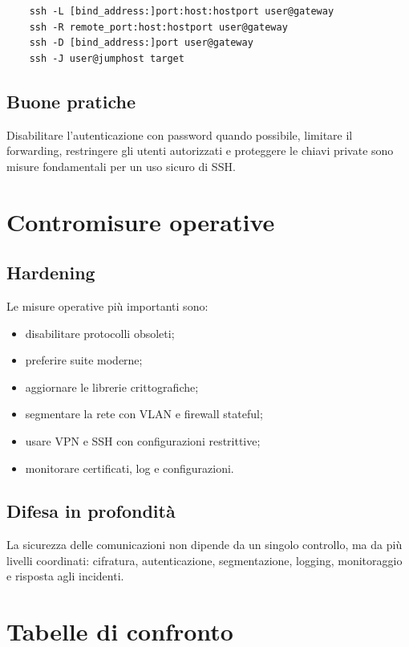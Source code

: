 \documentclass[12pt, a4paper]{report}
\begin{document}
\begin{verbatim}
	ssh -L [bind_address:]port:host:hostport user@gateway
	ssh -R remote_port:host:hostport user@gateway
	ssh -D [bind_address:]port user@gateway
	ssh -J user@jumphost target
\end{verbatim}

\subsection{Buone pratiche}
Disabilitare l'autenticazione con password quando possibile, limitare il forwarding, restringere gli utenti autorizzati e proteggere le chiavi private sono misure fondamentali per un uso sicuro di SSH.

\section{Contromisure operative}

\subsection{Hardening}
Le misure operative pi\`u importanti sono:
\begin{itemize}
	\item disabilitare protocolli obsoleti;
	\item preferire suite moderne;
	\item aggiornare le librerie crittografiche;
	\item segmentare la rete con VLAN e firewall stateful;
	\item usare VPN e SSH con configurazioni restrittive;
	\item monitorare certificati, log e configurazioni.
\end{itemize}

\subsection{Difesa in profondit\`a}
La sicurezza delle comunicazioni non dipende da un singolo controllo, ma da pi\`u livelli coordinati: cifratura, autenticazione, segmentazione, logging, monitoraggio e risposta agli incidenti.

\section{Tabelle di confronto}
\end{document}
